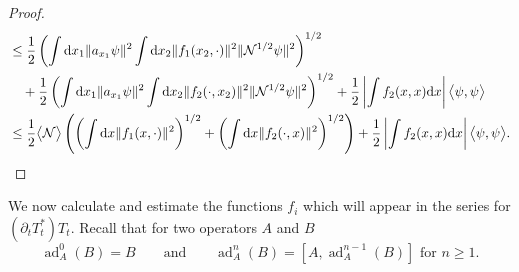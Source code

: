 \documentclass[11pt,a4paper,draft,DIV11]{scrartcl}	%
\newcommand{\ad}{\operatorname{ad}}	%
\newcommand{\di}{\textrm{d}}		%
\newcommand{\Ncal}{\mathcal{N}}		%
\newcommand{\scal}[2]{\big<#1,#2\big>} %
\newcommand{\norm}[1]{\lVert#1\rVert}	%
\newcommand{\ev}[1]{\big<#1\big>}	%
\begin{document}
\begin{proof}
\begin{align*}
& \leq \frac{1}{2} \left( \int \di x_1 \norm{a_{x_1}\psi}^2 \int \di x_2 \norm{f_1(x_2,\cdot)}^2 \norm{\Ncal^{1/2}\psi}^2 \right)^{1/2}\\
& \quad + \frac{1}{2} \left( \int \di x_1 \norm{a_{x_1}\psi}^2 \int \di x_2 \norm{f_2(\cdot,x_2)}^2 \norm{\Ncal^{1/2}\psi}^2 \right)^{1/2} + \frac{1}{2}\left\lvert \int f_2(x,x) \di x\right\rvert \scal{\psi}{\psi} \\
& \leq \frac{1}{2}\ev{\Ncal} \left(\left(\int \di x \norm{f_1(x,\cdot)}^2 \right)^{1/2} + \left(\int \di x \norm{f_2(\cdot,x)}^2 \right)^{1/2} \right) + \frac{1}{2}\left\lvert \int f_2(x,x) \di x\right\rvert \scal{\psi}{\psi}. 	\qedhere
 \end{align*}
\end{proof}

We now calculate and estimate the functions $f_i$ which will appear in the series for $(\partial_t T^*_t)T_t$. Recall that for two operators $A$ and $B$
\[
 \ad^0_A(B) = B \qquad \mbox{and} \qquad \ad^n_A(B) = [A,\ad^{n-1}_A(B)] \mbox{ for } n \geq 1.
\]
\end{document}
